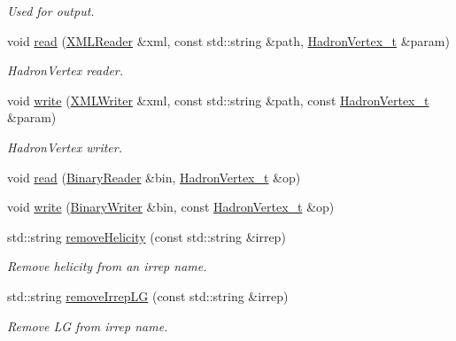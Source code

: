 \begin{DoxyCompactItemize}
\begin{DoxyCompactList}\small\item\em Used for output. \end{DoxyCompactList}\item 
void \mbox{\hyperlink{namespaceHadron_a83c06845cd19520623de3b0074b9d25c}{read}} (\mbox{\hyperlink{classADATXML_1_1XMLReader}{X\+M\+L\+Reader}} \&xml, const std\+::string \&path, \mbox{\hyperlink{structHadron_1_1HadronVertex__t}{Hadron\+Vertex\+\_\+t}} \&param)
\begin{DoxyCompactList}\small\item\em Hadron\+Vertex reader. \end{DoxyCompactList}\item 
void \mbox{\hyperlink{namespaceHadron_a9309edc67ae704a831f01ae854c5bf12}{write}} (\mbox{\hyperlink{classADATXML_1_1XMLWriter}{X\+M\+L\+Writer}} \&xml, const std\+::string \&path, const \mbox{\hyperlink{structHadron_1_1HadronVertex__t}{Hadron\+Vertex\+\_\+t}} \&param)
\begin{DoxyCompactList}\small\item\em Hadron\+Vertex writer. \end{DoxyCompactList}\item 
void \mbox{\hyperlink{namespaceHadron_a2aedc52f1b4f522f0fc13bbf7426e727}{read}} (\mbox{\hyperlink{classADATIO_1_1BinaryReader}{Binary\+Reader}} \&bin, \mbox{\hyperlink{structHadron_1_1HadronVertex__t}{Hadron\+Vertex\+\_\+t}} \&op)
\item 
void \mbox{\hyperlink{namespaceHadron_a6d8b26c4e0e11ca4b20e046f2595326e}{write}} (\mbox{\hyperlink{classADATIO_1_1BinaryWriter}{Binary\+Writer}} \&bin, const \mbox{\hyperlink{structHadron_1_1HadronVertex__t}{Hadron\+Vertex\+\_\+t}} \&op)
\item 
std\+::string \mbox{\hyperlink{namespaceHadron_a877ae1e797f5cf4d4ebb7e22d5bbe69b}{remove\+Helicity}} (const std\+::string \&irrep)
\begin{DoxyCompactList}\small\item\em Remove helicity from an irrep name. \end{DoxyCompactList}\item 
std\+::string \mbox{\hyperlink{namespaceHadron_aff55b5fd81ffee95432b7d4e1c8d01e6}{remove\+Irrep\+LG}} (const std\+::string \&irrep)
\begin{DoxyCompactList}\small\item\em Remove LG from irrep name. \end{DoxyCompactList}\item 

\end{DoxyCompactItemize}
